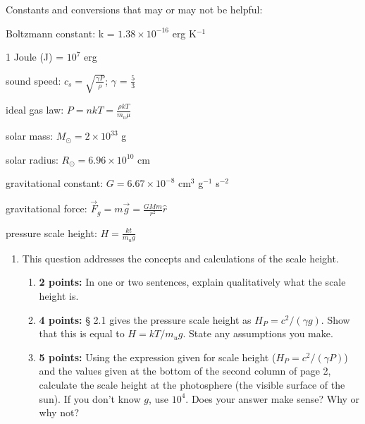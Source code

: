 \documentclass[12pt]{article}
\begin{document}
Constants and conversions that may or may not be helpful:
\begin{itemize*}
    \item Boltzmann constant: k = $1.38\times10^{-16}$ erg K$^{-1}$
    \item 1 Joule (J) = $10^{7}$ erg
    \item sound speed: $c_s = \sqrt{\frac{\gamma{P}}{\rho}}$;
        $\gamma$ = $\frac{5}{3}$
    \item ideal gas law: $P = nkT = \frac{\rho{kT}}{m_u{\mu}}$
    \item solar mass: $M_{\odot} = 2\times10^{33}$ g
    \item solar radius: $R_{\odot} = 6.96\times10^{10}$ cm
    \item gravitational constant: $G = 6.67\times10^{-8}$ cm$^{3}$ g$^{-1}$ s$^{-2}$
    \item gravitational force: $\vec{F}_{g} = m\vec{g} = \frac{GMm}{r^{2}}\hat{r}$
    \item pressure scale height: $H = \frac{kt}{m_{u}g}$
\end{itemize*}

\begin{enumerate}
\item This question addresses the concepts and calculations of the scale height.
\begin{enumerate}
    \item \textbf{2 points:} In one or two sentences, explain
        qualitatively what the scale height is.

    \item \textbf{4 points:} \S{} 2.1 gives the pressure scale
        height as $H_{P} = c^{2}/(\gamma{g})$. Show that this is
        equal to $H = kT/m_{u}g$. State any assumptions you make.

    \item \textbf{5 points:} Using the expression given for scale
        height ($H_{P} = c^{2}/(\gamma{P})$) and the values given at
        the bottom of the second column of page 2, calculate the
        scale height at the photosphere (the visible surface of
        the sun). If you don't know $g$, use $10^{4}$.
        Does your answer make sense? Why or why not?

\end{enumerate}
\end{enumerate}

\newpage
\end{document}
